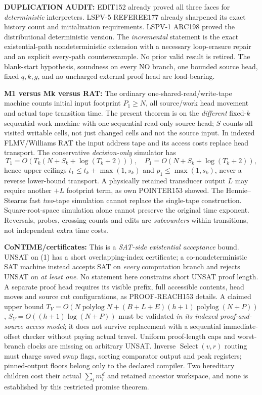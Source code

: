 \documentclass[11pt]{article}
\begin{document}
\textbf{DUPLICATION AUDIT:} EDIT152 already proved all three faces for \emph{deterministic} interpreters. LSPV-5 REFEREE177 already sharpened its exact history count and initialization requirements. LSPV-1 ARC198 proved the distributional deterministic version. The \emph{incremental} statement is the exact existential-path nondeterministic extension with a necessary loop-erasure repair and an explicit every-path counterexample. No prior valid result is retired. The blank-start hypothesis, soundness on every NO branch, one bounded source head, fixed $q,k,g$, and no uncharged external proof head are load-bearing.

\textbf{M1 versus Mk versus RAT:} The ordinary one-shared-read/write-tape machine counts initial input footprint $P_1\ge N$, all source/work head movement and actual tape transition time. The present theorem is on the \emph{different} fixed-$k$ sequential-work machine with one sequential read-only source head; $S$ counts all visited writable cells, not just changed cells and not the source input. In indexed FLMV/Williams RAT the input address tape and its access costs replace head transport. The conservative \emph{decision-only} simulator has
\[
T_1=O\!\left(T_k(N+S_k+\log(T_k+2))\right),\quad
P_1=O\!\left(N+S_k+\log(T_k+2)\right),
\]
hence upper ceilings $t_1\le t_k+\max(1,s_k)$ and $p_1\le\max(1,s_k)$, never a reverse lower-bound transport. A physically retained transducer output $L$ may require another $+L$ footprint term, as own POINTER153 showed. The Hennie--Stearns fast \emph{two}-tape simulation cannot replace the single-tape construction. Square-root-space simulation alone cannot preserve the original time exponent. Reversals, probes, crossing counts and edits are \emph{subcounters} within transitions, not independent extra time costs.

\textbf{CoNTIME/certificates:} This is a \emph{SAT-side existential acceptance} bound. UNSAT on (1) has a short overlapping-index certificate; a co-nondeterministic SAT machine instead accepts SAT on \emph{every} computation branch and rejects UNSAT on \emph{at least one}. No statement here constrains short UNSAT proof length. A separate proof head requires its visible prefix, full accessible contents, head moves and source cut configurations, as PROOF-REACH153 details. A claimed upper bound
$T_V=O(N\operatorname{polylog}N+(B+L+E)(h+1)\operatorname{polylog}(N+P))$,
$S_V=O((h+1)\log(N+P))$
must be validated \emph{in its indexed proof-and-source access model}; it does not survive replacement with a sequential immediate-offset checker without paying actual travel. Uniform proof-length caps and worst-branch clocks are missing on arbitrary UNSAT. Inverse $\operatorname{Select}(v,r)$ routing must charge saved swap flags, sorting comparator output and peak registers; pinned-output floors belong only to the declared compiler. Two hereditary children cost their actual $\sum_i m_i^d$ and retained ancestor workspace, and none is established by this restricted promise theorem.
\end{document}
